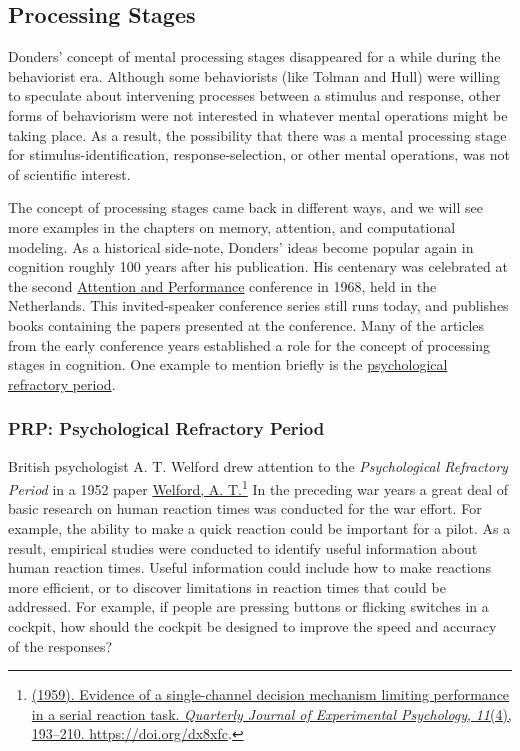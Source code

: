 \documentclass[
  oneside,
  12pt]{crumpbook}
\begin{document}
\hypertarget{processing-stages}{%
\subsection{Processing Stages}\label{processing-stages}}

Donders' concept of mental processing stages disappeared for a while during the behaviorist era. Although some behaviorists (like Tolman and Hull) were willing to speculate about intervening processes between a stimulus and response, other forms of behaviorism were not interested in whatever mental operations might be taking place. As a result, the possibility that there was a mental processing stage for stimulus-identification, response-selection, or other mental operations, was not of scientific interest.

The concept of processing stages came back in different ways, and we will see more examples in the chapters on memory, attention, and computational modeling. As a historical side-note, Donders' ideas become popular again in cognition roughly 100 years after his publication. His centenary was celebrated at the second \href{http://www.attentionandperformance.org}{Attention and Performance} conference in 1968, held in the Netherlands. This invited-speaker conference series still runs today, and publishes books containing the papers presented at the conference. Many of the articles from the early conference years established a role for the concept of processing stages in cognition. One example to mention briefly is the \href{https://en.wikipedia.org/wiki/Psychological_refractory_period}{psychological refractory period}.

\hypertarget{prp-psychological-refractory-period}{%
\subsubsection{PRP: Psychological Refractory Period}\label{prp-psychological-refractory-period}}

British psychologist A. T. Welford drew attention to the \emph{Psychological Refractory Period} in a 1952 paper \protect\hyperlink{ref-welfordEvidenceSinglechannelDecision1959}{Welford, A. T.}\footnote{\protect\hyperlink{ref-welfordEvidenceSinglechannelDecision1959}{(1959). Evidence of a single-channel decision mechanism limiting performance in a serial reaction task. \emph{Quarterly Journal of Experimental Psychology}, \emph{11}(4), 193--210. \url{https://doi.org/dx8xfc}}.} In the preceding war years a great deal of basic research on human reaction times was conducted for the war effort. For example, the ability to make a quick reaction could be important for a pilot. As a result, empirical studies were conducted to identify useful information about human reaction times. Useful information could include how to make reactions more efficient, or to discover limitations in reaction times that could be addressed. For example, if people are pressing buttons or flicking switches in a cockpit, how should the cockpit be designed to improve the speed and accuracy of the responses?
\end{document}
